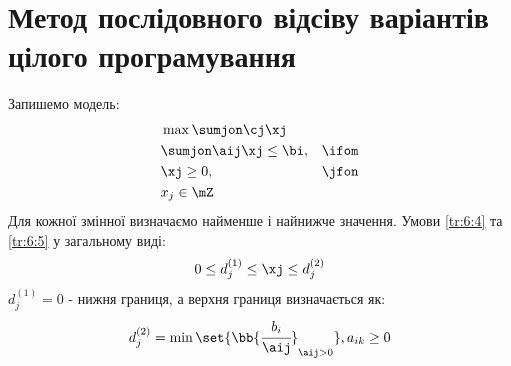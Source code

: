 \section{Метод послідовного відсіву варіантів цілого програмування}
Запишемо модель:
\begin{eqnarray}
&\max \sumjon \cj\xj &\\
&\sumjon \aij \xj \leq \bi,&\ifom\\
&\xj\geq 0,&\jfon\label{tr:6:4}\\
&x_j\in\mZ\label{tr:6:5}&
\end{eqnarray}
Для кожної змінної визначаємо найменше і найнижче значення. Умови \eqref{tr:6:4} та \eqref{tr:6:5} у загальному виді:
\begin{equation}
0 \leq d_j^{(1)} \leq \xj \leq d_j^{(2)}
\end{equation}
$d_j^{(1)}=0$ - нижня границя, а верхня границя визначається як:
\begin{equation}
d_j^{(2)} = \min\set{\bb{\cfrac{b_i}{\aij}}_{\aij>0}},a_{ik}\geq0
\end{equation}